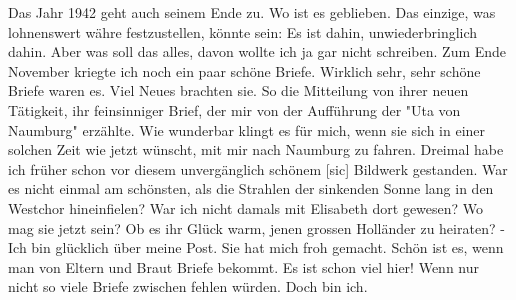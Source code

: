 \def\day{3. Dezember 1942}
\mktitle

Das Jahr 1942 geht auch seinem Ende zu.
Wo ist es geblieben.
Das einzige, was lohnenswert w\"{a}hre festzustellen, k\"{o}nnte sein: Es ist dahin, unwiederbringlich dahin.
Aber was soll das alles, davon wollte ich ja gar nicht schreiben.
Zum Ende November kriegte ich noch ein paar sch\"{o}ne Briefe.
Wirklich sehr, sehr sch\"{o}ne Briefe waren es.
Viel Neues brachten sie.
So die Mitteilung von ihrer neuen T\"{a}tigkeit, ihr feinsinniger Brief, der mir von der Auff\"{u}hrung der "Uta von Naumburg" erz\"{a}hlte.
Wie wunderbar klingt es f\"{u}r mich, wenn sie sich in einer solchen Zeit wie jetzt w\"{u}nscht, mit mir nach Naumburg zu fahren.
Dreimal habe ich fr\"{u}her schon vor diesem unverg\"{a}nglich sch\"{o}nem{\color{red} [sic] } Bildwerk gestanden.
War es nicht einmal am sch\"{o}nsten, als die Strahlen der sinkenden Sonne lang in den Westchor hineinfielen?
War ich nicht damals mit Elisabeth dort gewesen?
Wo mag sie jetzt sein?
Ob es ihr Gl\"{u}ck warm, jenen grossen Holl\"{a}nder zu heiraten?
- Ich bin gl\"{u}cklich \"{u}ber meine Post.
Sie hat mich froh gemacht.
Sch\"{o}n ist es, wenn man von Eltern und Braut Briefe bekommt.
Es ist schon viel hier!
Wenn nur nicht so viele Briefe zwischen fehlen w\"{u}rden.
Doch bin ich.

\clearpage
